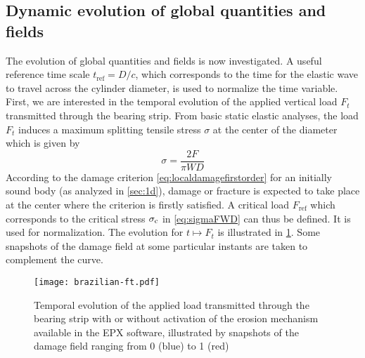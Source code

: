 \subsection{Dynamic evolution of global quantities and fields}
The evolution of global quantities and fields is now investigated. A useful reference time scale $t_\mathrm{ref}=D/c$, which corresponds to the time for the elastic wave to travel across the cylinder diameter, is used to normalize the time variable. First, we are interested in the temporal evolution of the applied vertical load $F_t$ transmitted through the bearing strip. From basic static elastic analyses, the load $F_t$ induces a maximum splitting tensile stress $\sigma$ at the center of the diameter which is given by
\begin{equation} \label{eq:sigmaFWD}
\sigma=\frac{2F}{\pi WD}
\end{equation}
According to the damage criterion \eqref{eq:localdamagefirstorder} for an initially sound body (as analyzed in \cref{sec:1d}), damage or fracture is expected to take place at the center where the criterion is firstly satisfied. A critical load $F_\mathrm{ref}$ which corresponds to the critical stress $\sigma_{\mathrm{c}}$ in \eqref{eq:sigmaFWD} can thus be defined. It is used for normalization. The evolution for $t\mapsto F_t$ is illustrated in \cref{fig:brazilian_ft}. Some snapshots of the damage field at some particular instants are taken to complement the curve.
\begin{figure}[htbp]
\centering
\texttt{[image: brazilian-ft.pdf]}
\caption{Temporal evolution of the applied load transmitted through the bearing strip with or without activation of the erosion mechanism available in the EPX software, illustrated by snapshots of the damage field ranging from 0 (blue) to 1 (red)} \label{fig:brazilian_ft}
\end{figure}

